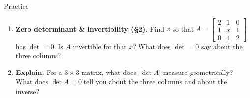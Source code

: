 \documentclass[10pt]{article}
\begin{document}
\begin{notesbox}{Practice}
\begin{enumerate}[leftmargin=1.9em, itemsep=11pt]
\begin{enumerate}[label=(\alph*), leftmargin=1.8em, itemsep=5pt]
      \item $\begin{bmatrix} 1 \\ 0 \\ 0 \end{bmatrix}, \begin{bmatrix} 2 \\ 3 \\ 0 \end{bmatrix}, \begin{bmatrix} 1 \\ 4 \\ 2 \end{bmatrix}$ \hfill {}
    \end{enumerate}
  \item \textbf{Zero determinant \& invertibility (§2).} Find $x$ so that
        $A=\begin{bmatrix} 2 & 1 & 0 \\ 1 & x & 1 \\ 0 & 1 & 2 \end{bmatrix}$ has $\det=0$.
        Is $A$ invertible for that $x$? What does $\det=0$ say about the three columns?
  \item \textbf{Explain.} For a $3\times3$ matrix, what does $|\det A|$ measure geometrically? What does
        $\det A=0$ tell you about the three columns and about the inverse?
\end{enumerate}
\end{notesbox}
\end{document}
